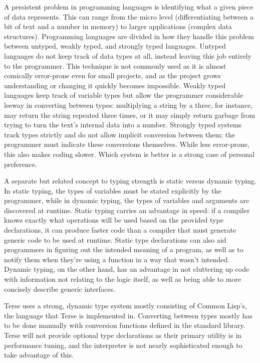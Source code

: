 \documentclass[12pt]{article}
\begin{document}
A persistent problem in programming languages is identifying what a
given piece of data represents. This can range from the micro level
(differentiating between a bit of text and a number in memory) to
larger applications (complex data structures). Programming languages
are divided in how they handle this problem between untyped, weakly
typed, and strongly typed languages. Untyped languages do not keep
track of data types at all, instead leaving this job entirely to the
programmer. This technique is not commonly used as it is almost
comically error-prone even for small projects, and as the project
grows understanding or changing it quickly becomes impossible. Weakly
typed languages keep track of variable types but allow the programmer
considerable leeway in converting between types: multiplying a string
by a three, for instance, may return the string repeated three times,
or it may simply return garbage from trying to turn the text's
internal data into a number. Strongly typed systems track types
strictly and do not allow implicit conversion between them; the
programmer must indicate these conversions themselves. While less
error-prone, this also makes coding slower. Which system is better is
a strong case of personal preference.

A separate but related concept to typing strength is static versus
dynamic typing. In static typing, the types of variables must be
stated explicitly by the programmer, while in dynamic typing, the
types of variables and arguments are discovered at runtime. Static
typing carries an advantage in speed: if a compiler knows exactly what
operations will be used based on the provided type declarations, it
can produce faster code than a compiler that must generate generic
code to be used at runtime. Static type declarations can also aid
programmers in figuring out the intended meaning of a program, as well
as to notify them when they're using a function in a way that wasn't
intended. Dynamic typing, on the other hand, has an advantage in not
cluttering up code with information not relating to the logic itself,
as well as being able to more concisely describe generic interfaces.

Terse uses a strong, dynamic type system mostly consisting of Common
Lisp's, the language that Terse is implemented in. Converting between
types mostly has to be done manually with conversion functions defined
in the standard library. Terse will not provide optional type
declarations as their primary utility is in performance tuning, and
the interpreter is not nearly sophisticated enough to take advantage
of this.
\end{document}
